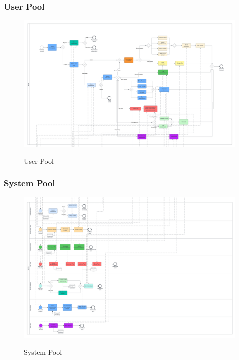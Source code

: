 \documentclass[12pt]{article}
\begin{document}
\subsubsection{User Pool}
\begin{figure}[H]
    \centering
        \includegraphics[width=1.0\textwidth]{BPMN/user.png}
        \label{fig:bpmn_userpool}
    \caption{User Pool}
\end{figure}

\newpage
\subsubsection{System Pool}
\begin{figure}[H]
    \centering
        \includegraphics[width=1.0\textwidth]{BPMN/system.png}
        \label{fig:bpmn_systempool}
    \caption{System Pool}
\end{figure}

\newpage
\end{document}
